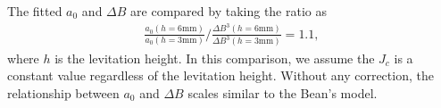 \documentclass[journal]{IEEEtran}
\begin{document}
The fitted $a_0$ and $\Delta B$ are compared by taking the ratio as
\begin{eqnarray}
\frac{a_0(h=6\mbox{mm})}{a_0(h=3\mbox{mm})} / \frac{\Delta B^3(h=6\mbox{mm})}{\Delta B^3(h=3\mbox{mm})} = 1.1,
\label{eq:beanmodelcheck}
\end{eqnarray}
where $h$ is the levitation height.
In this comparison, we assume the $J_c$ is a constant value regardless of the levitation height.
Without any correction, the relationship between $a_0$ and $\Delta B$ scales similar to the Bean's model.

\end{document}
